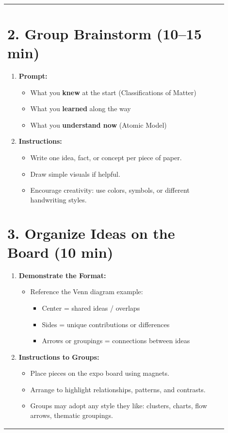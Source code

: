 \documentclass{article}
\begin{document}
\begin{flushleft}
\begin{tabular}{|p{0.9\linewidth}|}
\section*{2. Group Brainstorm (10--15 min)}
\begin{enumerate}[label=\arabic*.]
    \item \textbf{Prompt:}
    \begin{itemize}
        \item What you \textbf{knew} at the start (Classifications of Matter)
        \item What you \textbf{learned} along the way
        \item What you \textbf{understand now} (Atomic Model)
    \end{itemize}
    \item \textbf{Instructions:}
    \begin{itemize}
        \item Write one idea, fact, or concept per piece of paper.
        \item Draw simple visuals if helpful.
        \item Encourage creativity: use colors, symbols, or different handwriting styles.
    \end{itemize}
\end{enumerate}

\section*{3. Organize Ideas on the Board (10 min)}
\begin{enumerate}[label=\arabic*.]
    \item \textbf{Demonstrate the Format:}
    \begin{itemize}
        \item Reference the Venn diagram example:
        \begin{itemize}
            \item Center = shared ideas / overlaps
            \item Sides = unique contributions or differences
            \item Arrows or groupings = connections between ideas
        \end{itemize}
    \end{itemize}
    \item \textbf{Instructions to Groups:}
    \begin{itemize}
        \item Place pieces on the expo board using magnets.
        \item Arrange to highlight relationships, patterns, and contrasts.
        \item Groups may adopt any style they like: clusters, charts, flow arrows, thematic groupings.
    \end{itemize}
\end{enumerate} \\


\end{tabular}
\end{flushleft}
\end{document}
